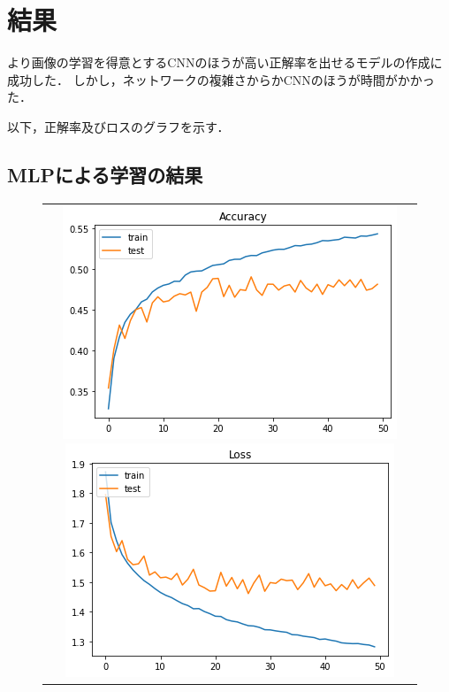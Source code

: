 \documentclass[a4paper, titlepage]{jsarticle}
\begin{document}
	\section{結果}
	より画像の学習を得意とするCNNのほうが高い正解率を出せるモデルの作成に成功した．
	しかし，ネットワークの複雑さからかCNNのほうが時間がかかった．

	以下，正解率及びロスのグラフを示す．

	\subsection{MLPによる学習の結果}
	\begin{figure}[ht]
		\begin{tabular}{c}
			\begin{minipage}{0.5\hsize}
				\centering
				\includegraphics[keepaspectratio, scale=0.45]{result1-1.png}
			\end{minipage}
			\begin{minipage}{0.5\hsize}
				\centering
				\includegraphics[keepaspectratio, scale=0.45]{result1-2.png}
			\end{minipage}
		\end{tabular}
	\end{figure}
\end{document}
